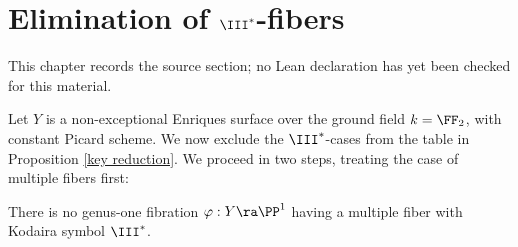 \chapter{Elimination of    \texorpdfstring{$\III^*$}{III*}-fibers}
\label{no-enriques-surface-over-the-integers-chapter-14}

\begin{remark}
\label{no-enriques-surface-over-the-integers-chapter-14-source}
This chapter records the source section; no Lean declaration has yet been checked for this material.
\notready
\end{remark}

\label{Elimination III*}

Let $Y$ is a non-exceptional Enriques surface over the ground field $k=\FF_2$, with constant Picard scheme.
We now exclude the $\III^*$-cases from the table in Proposition \ref{key reduction}.
We proceed in two steps, treating the case of multiple fibers first:

\begin{proposition}
\notready
\label{no multiple III*}
There is no genus-one fibration  $\varphi:Y\ra\PP^1$ having a multiple  fiber with Kodaira symbol $\III^*$.
\end{proposition}

